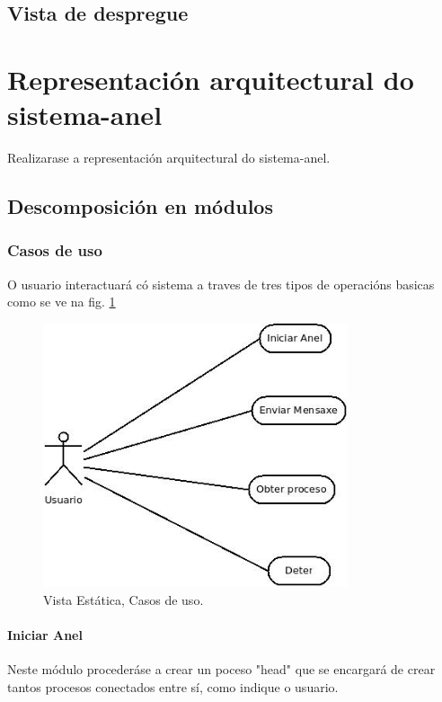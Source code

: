\documentclass[DIV=calc,paper=a4,fontsize=11pt,onecolumn]{scrartcl}	 %
\begin{document}
\subsection{Vista de despregue}

\section{Representación arquitectural do sistema-anel}

Realizarase a representación arquitectural do sistema-anel.

\subsection{Descomposición en módulos}
\subsubsection{Casos de uso}
O usuario interactuará có sistema a traves de tres tipos de operacións basicas como se ve na fig. \ref{fig:anelEstCU}

\begin{figure}[h]
\centering
\includegraphics[width=0.8\textwidth]{./figuras/Diagrama1.jpeg}
\caption{Vista Estática, Casos de uso.}
\label{fig:anelEstCU}
\end{figure}

\paragraph{Iniciar Anel}
Neste módulo procederáse a crear un poceso "head" que se encargará de crear tantos procesos conectados entre sí, como indique o usuario.
\end{document}
